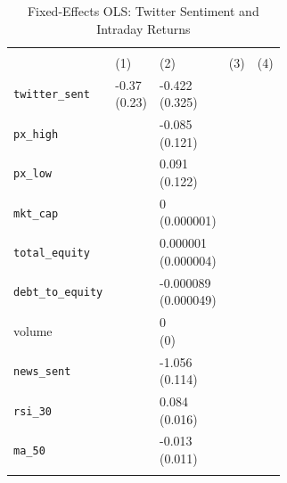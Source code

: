 \begin{table}[htbp]
\centering
\caption{Fixed-Effects OLS: Twitter Sentiment and Intraday Returns\label{tab:fe_ols}}
\small
\begin{threeparttable}
\begingroup
\renewcommand\cellalign{t}
\renewcommand\arraystretch{1}
\setlength{\tabcolsep}{3pt}
\begin{tabularx}{\linewidth}{@{}>{\raggedright\arraybackslash}l>{\centering\arraybackslash}X>{\centering\arraybackslash}X>{\centering\arraybackslash}X>{\centering\arraybackslash}X}
\toprule
 & \multicolumn{4}{c}{return} \\
\cmidrule(lr){2-5}
 & (1) & (2) & (3) & (4) \\
\midrule
\addlinespace[1ex]
\texttt{twitter\_sent} & \makecell{-0.37 \\ (0.23)} & \makecell{-0.422 \\ (0.325)} &  &  \\
\addlinespace[0.5ex]
\addlinespace[0.5ex]
\texttt{px\_high} &  & \makecell{-0.085 \\ (0.121)} &  &  \\
\addlinespace[0.5ex]
\addlinespace[0.5ex]
\texttt{px\_low} &  & \makecell{0.091 \\ (0.122)} &  &  \\
\addlinespace[0.5ex]
\addlinespace[0.5ex]
\texttt{mkt\_cap} &  & \makecell{0 \\ (0.000001)} &  &  \\
\addlinespace[0.5ex]
\addlinespace[0.5ex]
\texttt{total\_equity} &  & \makecell{0.000001 \\ (0.000004)} &  &  \\
\addlinespace[0.5ex]
\addlinespace[0.5ex]
\texttt{debt\_to\_equity} &  & \makecell{-0.000089 \\ (0.000049)} &  &  \\
\addlinespace[0.5ex]
\addlinespace[0.5ex]
volume &  & \makecell{0 \\ (0)} &  &  \\
\addlinespace[0.5ex]
\addlinespace[0.5ex]
\texttt{news\_sent} &  & \makecell{-1.056 \\ (0.114)} &  &  \\
\addlinespace[0.5ex]
\addlinespace[0.5ex]
\texttt{rsi\_30} &  & \makecell{0.084 \\ (0.016)} &  &  \\
\addlinespace[0.5ex]
\addlinespace[0.5ex]
\texttt{ma\_50} &  & \makecell{-0.013 \\ (0.011)} &  &  \\
\addlinespace[0.5ex]

\end{tabularx}
\end{threeparttable}
\end{table}
